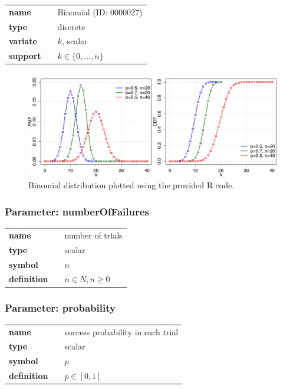 \begin{tabular}{p{2cm}cl}
\textbf{name} & & Binomial (ID: 0000027)\\ 
 
\textbf{type} & & discrete \\ 

\textbf{variate} & & $k$, scalar \\ 

\textbf{support} & & $k \in \{0,\dots,n\}$
\end{tabular}

\begin{figure}[ht!]
\centering
  \includegraphics[width=140mm]{pics/Binomial.pdf}
 \caption{Binomial distribution plotted using the provided R code.}
 \label{fig:Binomial}
\end{figure}

\subsubsection*{Parameter: numberOfFailures}

\noindent\begin{tabular}{p{2cm}cl}
\textbf{name} & & number of trials \\
\textbf{type} & & scalar \\
\textbf{symbol} & & $n$  \\
\textbf{definition} & & $n \in N, n \ge 0$
\end{tabular}
\subsubsection*{Parameter: probability}

\noindent\begin{tabular}{p{2cm}cl}
\textbf{name} & & success probability in each trial \\
\textbf{type} & & scalar \\
\textbf{symbol} & & $p$  \\
\textbf{definition} & & $p \in [0,1]$
\end{tabular}
